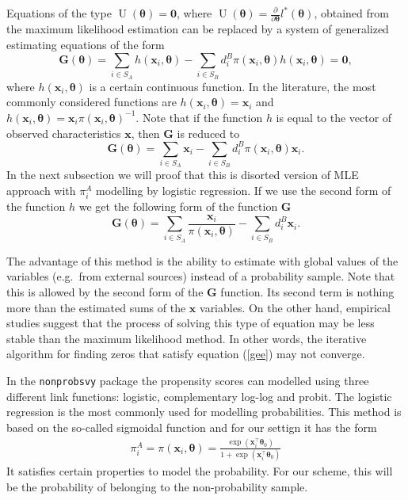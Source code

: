 \documentclass[
]{jss}
\begin{document}
Equations of the type
\(\operatorname{U}(\boldsymbol{\theta}) = \boldsymbol{0}\), where
\(\operatorname{U}(\boldsymbol{\theta}) = \frac{\partial}{\partial \boldsymbol{\theta}} l^*(\boldsymbol{\theta})\),
obtained from the maximum likelihood estimation can be replaced by a
system of generalized estimating equations of the form \begin{equation}
\label{gee}
\mathbf{G}(\boldsymbol{\theta})=\sum_{i \in S_A} h\left(\boldsymbol{x}_i, \boldsymbol{\theta}\right)-\sum_{i \in S_B} d_i^B \pi\left(\boldsymbol{x}_i, \boldsymbol{\theta}\right) h\left(\boldsymbol{x}_i, \boldsymbol{\theta}\right) = \boldsymbol{0},
\end{equation} where
\(h\left(\boldsymbol{x}_i, \boldsymbol{\theta}\right)\) is a certain
continuous function. In the literature, the most commonly considered
functions are
\(h\left(\boldsymbol{x}_i, \boldsymbol{\theta}\right) = \boldsymbol{x}_i\)
and
\(h\left(\boldsymbol{x}_i, \boldsymbol{\theta}\right) = \boldsymbol{x}_i \pi\left(\boldsymbol{x}_i, \boldsymbol{\theta}\right)^{-1}\).
Note that if the function \(h\) is equal to the vector of observed
characteristics \(\boldsymbol{x}\), then \(\mathbf{G}\) is reduced to \[
\mathbf{G}(\boldsymbol{\theta}) = \sum_{i \in S_A} \boldsymbol{x}_i-\sum_{i \in S_B} d_i^B \pi\left(\boldsymbol{x}_i, \boldsymbol{\theta}\right) \boldsymbol{x}_i.
\] In the next subsection we will proof that this is disorted version of
MLE approach with \(\pi_i^A\) modelling by logistic regression. If we
use the second form of the function \(h\) we get the following form of
the function \(\mathbf{G}\) \[
\mathbf{G}(\boldsymbol{\theta}) = \sum_{i \in S_A} \frac{\boldsymbol{x}_i}{\pi\left(\boldsymbol{x}_i, \boldsymbol{\theta}\right) }-\sum_{i \in S_B} d_i^B \boldsymbol{x}_i.
\]

The advantage of this method is the ability to estimate with global
values of the variables (e.g.~from external sources) instead of a
probability sample. Note that this is allowed by the second form of the
\(\mathbf{G}\) function. Its second term is nothing more than the
estimated sums of the \(\boldsymbol{x}\) variables. On the other hand,
empirical studies suggest that the process of solving this type of
equation may be less stable than the maximum likelihood method. In other
words, the iterative algorithm for finding zeros that satisfy equation
(\ref{gee}) may not converge.

In the \texttt{nonprobsvy} package the propensity scores can modelled
using three different link functions: logistic, complementary log-log
and probit. The logistic regression is the most commonly used for
modelling probabilities. This method is based on the so-called sigmoidal
function and for our settign it has the form \begin{align}
\label{logit-fun}
    \pi_{i}^{A} = \pi(\boldsymbol{x}_{i}, \boldsymbol{\theta}) = \frac{\exp\left(\boldsymbol{x}_{i}^{\top}\boldsymbol{\theta}_{0}\right)}{ 1 + \exp\left(\boldsymbol{x}_{i}^{\top}\boldsymbol{\theta}_{0}\right)}
\end{align} It satisfies certain properties to model the probability.
For our scheme, this will be the probability of belonging to the
non-probability sample.
\end{document}
